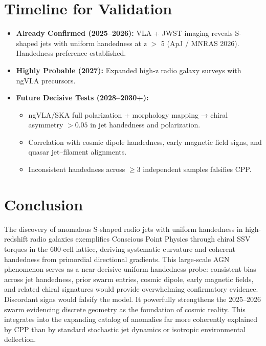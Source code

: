 \documentclass[11pt]{article}
\begin{document}
\section{Timeline for Validation}
\begin{itemize}
    \item \textbf{Already Confirmed (2025--2026):} VLA + JWST imaging reveals S-shaped jets with uniform handedness at z $>$ 5 (ApJ / MNRAS 2026). Handedness preference established.
    \item \textbf{Highly Probable (2027):} Expanded high-z radio galaxy surveys with ngVLA precursors.
    \item \textbf{Future Decisive Tests (2028--2030+):}
    \begin{itemize}
        \item ngVLA/SKA full polarization + morphology mapping → chiral asymmetry $>0.05$ in jet handedness and polarization.
        \item Correlation with cosmic dipole handedness, early magnetic field signs, and quasar jet–filament alignments.
        \item Inconsistent handedness across $\geq 3$ independent samples falsifies CPP.
    \end{itemize}
\end{itemize}

\section{Conclusion}
The discovery of anomalous S-shaped radio jets with uniform handedness in high-redshift radio galaxies exemplifies Conscious Point Physics through chiral SSV torques in the 600-cell lattice, deriving systematic curvature and coherent handedness from primordial directional gradients.  
This large-scale AGN phenomenon serves as a near-decisive uniform handedness probe: consistent bias across jet handedness, prior swarm entries, cosmic dipole, early magnetic fields, and related chiral signatures would provide overwhelming confirmatory evidence. Discordant signs would falsify the model. It powerfully strengthens the 2025--2026 swarm evidencing discrete geometry as the foundation of cosmic reality.  
This integrates into the expanding catalog of anomalies far more coherently explained by CPP than by standard stochastic jet dynamics or isotropic environmental deflection.
\end{document}

